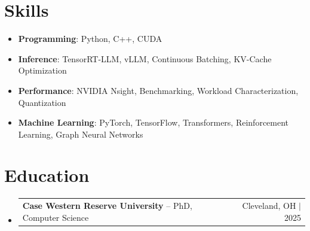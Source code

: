 \documentclass[letterpaper,13pt]{article}
\makeatletter
\newcommand{\resumeProjectHeading}[2]{
    \item
    \begin{tabular*}{\textwidth}{l@{\extracolsep{\fill}}r}
      \small#1 & #2 \\
    \end{tabular*}\vspace{-4pt}
}
\newcommand{\resumeSubHeadingListStart}{\begin{itemize}[leftmargin=0in, label={}]}
\newcommand{\resumeSubHeadingListEnd}{\end{itemize}}
\makeatother
\begin{document}
\section{Skills}
\vspace{0.02cm}
\begin{itemize}[leftmargin=0.15in, label={}, itemsep=2pt, topsep=1pt]
  \item \textbf{Programming}: Python, C++, CUDA
  \item \textbf{Inference}: TensorRT-LLM, vLLM, Continuous Batching, KV-Cache Optimization
  \item \textbf{Performance}: NVIDIA Nsight, Benchmarking, Workload Characterization, Quantization
  \item \textbf{Machine Learning}: PyTorch, TensorFlow, Transformers, Reinforcement Learning, Graph Neural Networks
\end{itemize}
\vspace{0.02cm}

\section{Education}
\resumeSubHeadingListStart
  \resumeProjectHeading{\textbf{Case Western Reserve University} -- PhD, Computer Science}{Cleveland, OH $|$ 2025}
\resumeSubHeadingListEnd
\end{document}
